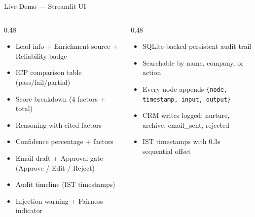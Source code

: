 \documentclass[aspectratio=169,10pt]{beamer}
\begin{document}
\begin{frame}{Live Demo — Streamlit UI}
\vspace{4pt}
\begin{columns}[T]
\begin{column}{0.48\textwidth}
  \begin{tcolorbox}[colback=cardbg,colframe=cardborder,arc=3mm,fonttitle=\scriptsize\bfseries,
    title={\faInfoCircle\; Lead Detail}]
    \scriptsize
    \begin{itemize}\setlength\itemsep{2pt}
      \item Lead info + Enrichment source + Reliability badge
      \item ICP comparison table (pass/fail/partial)
      \item Score breakdown (4 factors + total)
      \item Reasoning with cited factors
      \item Confidence percentage + factors
      \item Email draft + Approval gate (Approve / Edit / Reject)
      \item Audit timeline (IST timestamps)
      \item Injection warning + Fairness indicator
    \end{itemize}
  \end{tcolorbox}
\end{column}
\begin{column}{0.48\textwidth}
  \begin{tcolorbox}[colback=cardbg,colframe=cardborder,arc=3mm,fonttitle=\scriptsize\bfseries,
    title={\faClipboardList\; Audit Log}]
    \scriptsize
    \begin{itemize}\setlength\itemsep{2pt}
      \item SQLite-backed persistent audit trail
      \item Searchable by name, company, or action
      \item Every node appends \texttt{\{node, timestamp, input, output\}}
      \item CRM writes logged: nurture, archive, email\_sent, rejected
      \item IST timestamps with 0.3s sequential offset
    \end{itemize}
  \end{tcolorbox}
\end{column}
\end{columns}
\end{frame}
\end{document}
